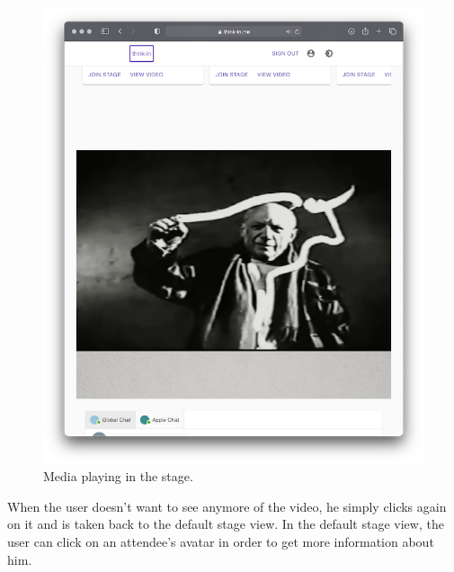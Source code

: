 \begin{figure}[H]
	\includegraphics[width=\textwidth,keepaspectratio]{images/business_logic/main_page_signed_in_center_video.png}
	\caption{Media playing in the stage.}
	\label{figure:website-main-page-playing-media}
\end{figure}

When the user doesn't want to see anymore of the video, he simply clicks again on it and is taken back to the default stage view. In the default stage view, the user can click on an attendee's avatar in order to get more information about him.

